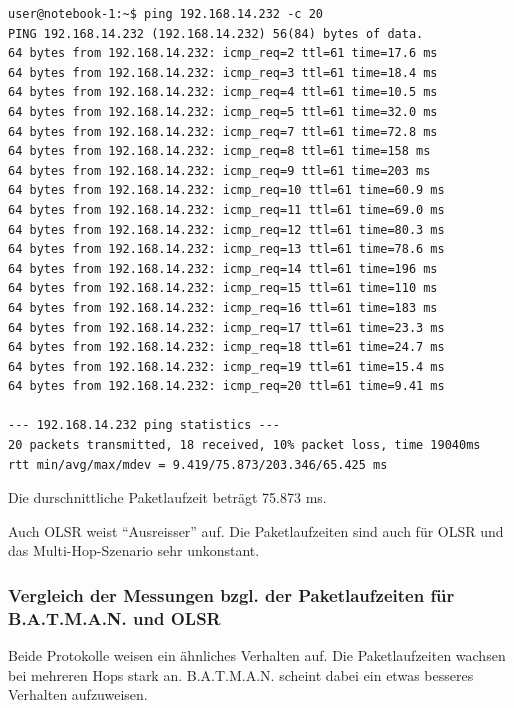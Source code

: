 \documentclass[a4paper,10pt]{article}
\begin{document}
\begin{lstlisting}
user@notebook-1:~$ ping 192.168.14.232 -c 20
PING 192.168.14.232 (192.168.14.232) 56(84) bytes of data.
64 bytes from 192.168.14.232: icmp_req=2 ttl=61 time=17.6 ms
64 bytes from 192.168.14.232: icmp_req=3 ttl=61 time=18.4 ms
64 bytes from 192.168.14.232: icmp_req=4 ttl=61 time=10.5 ms
64 bytes from 192.168.14.232: icmp_req=5 ttl=61 time=32.0 ms
64 bytes from 192.168.14.232: icmp_req=7 ttl=61 time=72.8 ms
64 bytes from 192.168.14.232: icmp_req=8 ttl=61 time=158 ms
64 bytes from 192.168.14.232: icmp_req=9 ttl=61 time=203 ms
64 bytes from 192.168.14.232: icmp_req=10 ttl=61 time=60.9 ms
64 bytes from 192.168.14.232: icmp_req=11 ttl=61 time=69.0 ms
64 bytes from 192.168.14.232: icmp_req=12 ttl=61 time=80.3 ms
64 bytes from 192.168.14.232: icmp_req=13 ttl=61 time=78.6 ms
64 bytes from 192.168.14.232: icmp_req=14 ttl=61 time=196 ms
64 bytes from 192.168.14.232: icmp_req=15 ttl=61 time=110 ms
64 bytes from 192.168.14.232: icmp_req=16 ttl=61 time=183 ms
64 bytes from 192.168.14.232: icmp_req=17 ttl=61 time=23.3 ms
64 bytes from 192.168.14.232: icmp_req=18 ttl=61 time=24.7 ms
64 bytes from 192.168.14.232: icmp_req=19 ttl=61 time=15.4 ms
64 bytes from 192.168.14.232: icmp_req=20 ttl=61 time=9.41 ms

--- 192.168.14.232 ping statistics --- 
20 packets transmitted, 18 received, 10% packet loss, time 19040ms
rtt min/avg/max/mdev = 9.419/75.873/203.346/65.425 ms
\end{lstlisting}

Die durschnittliche Paketlaufzeit beträgt 75.873 ms.

Auch OLSR weist "`Ausreisser"' auf.
Die Paketlaufzeiten sind auch für OLSR und das Multi-Hop-Szenario sehr unkonstant.

\subsubsection{Vergleich der Messungen bzgl. der Paketlaufzeiten für B.A.T.M.A.N. und OLSR}

Beide Protokolle weisen ein ähnliches Verhalten auf.
Die Paketlaufzeiten wachsen bei mehreren Hops stark an.
B.A.T.M.A.N. scheint dabei ein etwas besseres Verhalten aufzuweisen.

%
%
%
%
%
%
%
%
%
%
%
\end{document}
